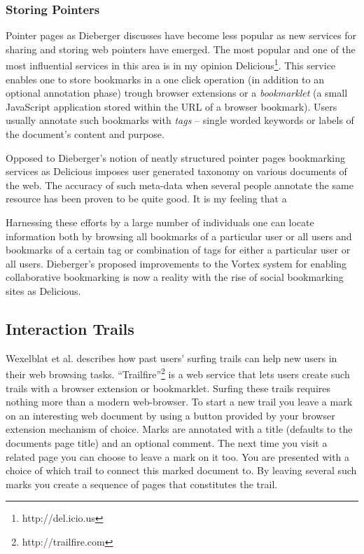 \documentclass[12pt,a4paper]{article}
\begin{document}
\subsubsection{Storing Pointers}

Pointer pages as Dieberger discusses have become less popular as new services
for sharing and storing web pointers have emerged. The most popular and one of
the most influential services in this area is in my opinion
Delicious\footnote{http://del.icio.us}. This service enables one to store
bookmarks in a one click operation (in addition to an optional annotation
phase) trough browser extensions or a \emph{bookmarklet} (a small JavaScript
application stored within the URL of a browser bookmark). Users usually
annotate such bookmarks with \emph{tags} -- single worded keywords or labels of
the document's content and purpose.

Opposed to Dieberger's notion of neatly structured pointer pages
bookmarking services as Delicious imposes user generated taxonomy on various
documents of the web. The accuracy of such meta-data when several people
annotate the same resource has been proven to be quite good\cite{golder05}. It
is my feeling that a

Harnessing these efforts by a large number of individuals one can locate
information both by browsing all
bookmarks of a particular user or all users and bookmarks of a certain tag or
combination of tags for either a particular user or all users.
Dieberger's proposed improvements to the Vortex system for enabling
collaborative bookmarking is now a reality with the rise of social bookmarking
sites as Delicious.




\subsection{Interaction Trails}

Wexelblat et al. describes how past users' surfing trails can help new users
in their web browsing tasks. ``Trailfire''\footnote{http://trailfire.com} is a
web service that lets users create such trails with a browser extension or
bookmarklet. Surfing these trails requires nothing more than a modern
web-browser. To start a new trail you leave a mark on an interesting web
document by using a button provided by your browser extension mechanism of
choice. Marks are annotated with a title (defaults to the documents page
title) and an optional comment. The next time you visit a related page you can
choose to leave a mark on it too. You are presented with a choice of which
trail to connect this marked document to. By leaving several such marks you
create a sequence of pages that constitutes the trail.
\end{document}
